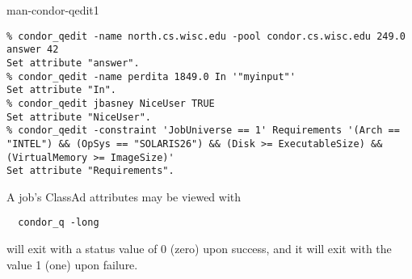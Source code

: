 \begin{ManPage}{}{man-condor-qedit}{1}
\Examples
\footnotesize
\begin{verbatim}
% condor_qedit -name north.cs.wisc.edu -pool condor.cs.wisc.edu 249.0 answer 42
Set attribute "answer".
% condor_qedit -name perdita 1849.0 In '"myinput"'
Set attribute "In".
% condor_qedit jbasney NiceUser TRUE
Set attribute "NiceUser".
% condor_qedit -constraint 'JobUniverse == 1' Requirements '(Arch == "INTEL") && (OpSys == "SOLARIS26") && (Disk >= ExecutableSize) && (VirtualMemory >= ImageSize)'
Set attribute "Requirements".
\end{verbatim}
\normalsize

\GenRem
A job's ClassAd attributes may be viewed with 
\begin{verbatim}
  condor_q -long
\end{verbatim}

\ExitStatus

 will exit with a status value of 0 (zero) upon success,
and it will exit with the value 1 (one) upon failure.

\end{ManPage}
